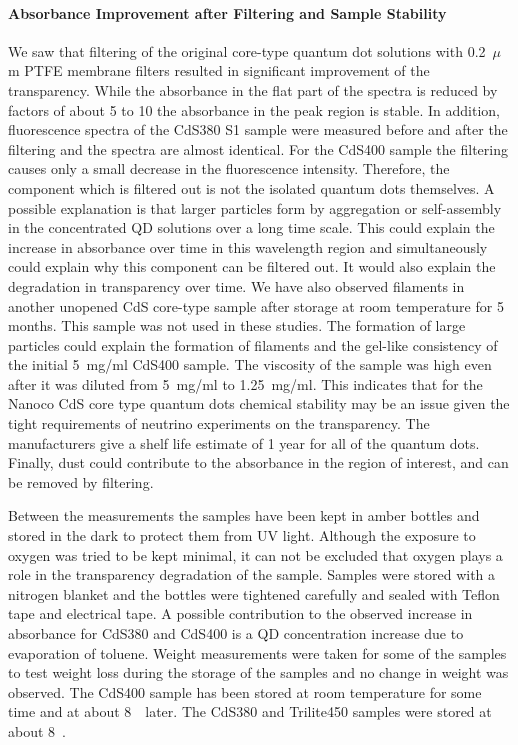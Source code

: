 \documentclass[cits]{JINST}
\begin{document}
\paragraph{Absorbance Improvement after Filtering and Sample Stability}
We saw that filtering of the original core-type quantum dot solutions with 0.2~$\mu$m PTFE membrane filters resulted in significant improvement of the transparency. While the absorbance in the flat part of the spectra is reduced by factors of about 5 to 10 the absorbance in the peak region is stable. In addition, fluorescence spectra of the CdS380 S1 sample were measured before and after the filtering and the spectra are almost identical. For the CdS400 sample the filtering causes only a small decrease in the fluorescence intensity. Therefore, the component which is filtered out is not the isolated quantum dots themselves. A possible explanation is that larger particles form by aggregation or self-assembly in the concentrated QD solutions over a long time scale. This could explain the increase in absorbance over time in this wavelength region and simultaneously could explain why this component can be filtered out. It would also explain the degradation in transparency over time. We have also observed filaments in another unopened CdS core-type sample after storage at room temperature for 5 months. This sample was not used in these studies. The formation of large particles could explain the formation of filaments and the gel-like consistency of the initial 5~mg/ml CdS400 sample. The viscosity of the sample was high even after it was diluted from 5~mg/ml to 1.25~mg/ml. This indicates that for the Nanoco CdS core type quantum dots chemical stability may be an issue given the tight requirements of neutrino experiments on the transparency. The manufacturers give a shelf life estimate of 1 year for all of the quantum dots. Finally, dust could contribute to the absorbance in the region of interest, and can be removed by filtering.  

Between the measurements the samples have been kept in amber bottles and stored in the dark to protect them from UV light. Although the exposure to oxygen was tried to be kept minimal, it can not be excluded that oxygen plays a role in the transparency degradation of the sample. Samples were stored with a nitrogen blanket and the bottles were tightened carefully and sealed with Teflon tape and electrical tape. A possible contribution to the observed increase in absorbance for CdS380 and CdS400 is a QD concentration increase due to evaporation of toluene. Weight measurements were taken for some of the samples to test weight loss during the storage of the samples and no change in weight was observed. The CdS400 sample has been stored at room temperature for some time and at about 8~\textcelsius ~later. The CdS380 and Trilite450 samples were stored at about 8~\textcelsius.
\end{document}
